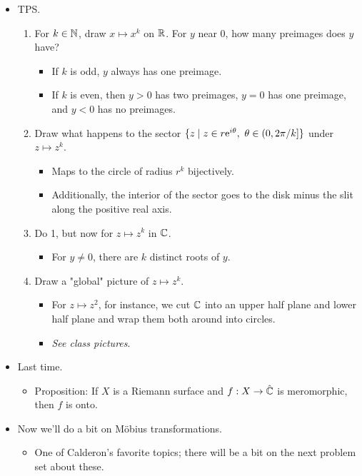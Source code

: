 \documentclass[../notes.tex]{subfiles}
\begin{document}
\begin{itemize}
    \item TPS.
    \begin{enumerate}
        \item For $k\in\mathbb{N}$, draw $x\mapsto x^k$ on $\mathbb{R}$. For $y$ near 0, how many preimages does $y$ have?
        \begin{itemize}
            \item If $k$ is odd, $y$ always has one preimage.
            \item If $k$ is even, then $y>0$ has two preimages, $y=0$ has one preimage, and $y<0$ has no preimages.
        \end{itemize}
        \item Draw what happens to the sector $\{z\mid z\in r\e[i\theta],\ \theta\in(0,2\pi/k]\}$ under $z\mapsto z^k$.
        \begin{itemize}
            \item Maps to the circle of radius $r^k$ bijectively.
            \item Additionally, the interior of the sector goes to the disk minus the slit along the positive real axis.
        \end{itemize}
        \item Do 1, but now for $z\mapsto z^k$ in $\mathbb{C}$.
        \begin{itemize}
            \item For $y\neq 0$, there are $k$ distinct roots of $y$.
        \end{itemize}
        \item Draw a "global" picture of $z\mapsto z^k$.
        \begin{itemize}
            \item For $z\mapsto z^2$, for instance, we cut $\mathbb{C}$ into an upper half plane and lower half plane and wrap them both around into circles.
            \item \emph{See class pictures}.
        \end{itemize}
    \end{enumerate}
    \item Last time.
    \begin{itemize}
        \item Proposition: If $X$ is a Riemann surface and $f:X\to\hat{\mathbb{C}}$ is meromorphic, then $f$ is onto.
    \end{itemize}
    \item Now we'll do a bit on M\"{o}bius transformations.
    \begin{itemize}
        \item One of Calderon's favorite topics; there will be a bit on the next problem set about these.

\end{itemize}
\end{itemize}
\end{document}
